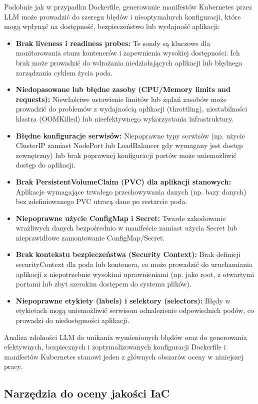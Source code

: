 Podobnie jak w przypadku Dockerfile, generowanie manifestów Kubernetes przez LLM może prowadzić do szeregu błędów i nieoptymalnych konfiguracji, które mogą wpłynąć na dostępność, bezpieczeństwo lub wydajność aplikacji:
\begin{itemize}
\item \textbf{Brak liveness i readiness probes:} Te sondy są kluczowe dla monitorowania stanu kontenerów i zapewnienia wysokiej dostępności. Ich brak może prowadzić do wdrażania niedziałających aplikacji lub błędnego zarządzania cyklem życia poda.
\item \textbf{Niedopasowane lub błędne zasoby (CPU/Memory limits and requests):} Niewłaściwe ustawienie limitów lub żądań zasobów może prowadzić do problemów z wydajnością aplikacji (throttling), niestabilności klastra (OOMKilled) lub nieefektywnego wykorzystania infrastruktury.
\item \textbf{Błędne konfiguracje serwisów:} Niepoprawne typy serwisów (np. użycie ClusterIP zamiast NodePort lub LoadBalancer gdy wymagany jest dostęp zewnętrzny) lub brak poprawnej konfiguracji portów może uniemożliwić dostęp do aplikacji.
\item \textbf{Brak PersistentVolumeClaim (PVC) dla aplikacji stanowych:} Aplikacje wymagające trwałego przechowywania danych (np. bazy danych) bez zdefiniowanego PVC utracą dane po restarcie poda.
\item \textbf{Niepoprawne użycie ConfigMap i Secret:} Twarde zakodowanie wrażliwych danych bezpośrednio w manifeście zamiast użycia Secret lub nieprawidłowe zamontowanie ConfigMap/Secret.
\item \textbf{Brak kontekstu bezpieczeństwa (Security Context):} Brak definicji securityContext dla poda lub kontenera, co może prowadzić do uruchamiania aplikacji z niepotrzebnie wysokimi uprawnieniami (np. jako root, z otwartymi portami lub zbyt szerokim dostępem do systemu plików).
\item \textbf{Niepoprawne etykiety (labels) i selektory (selectors):} Błędy w etykietach mogą uniemożliwić serwisom odnalezienie odpowiednich podów, co prowadzi do niedostępności aplikacji.
\end{itemize}

Analiza zdolności LLM do unikania wymienionych błędów oraz do generowania efektywnych, bezpiecznych i zoptymalizowanych konfiguracji Dockerfile i manifestów Kubernetes stanowi jeden z głównych obszarów oceny w niniejszej pracy.



\subsection{Narzędzia do oceny jakości IaC}

